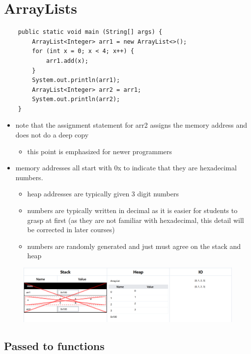 \documentclass{article}
\begin{document}
\pagebreak


\section{ArrayLists}

\begin{verbatim}
	public static void main (String[] args) {
	    ArrayList<Integer> arr1 = new ArrayList<>();
	    for (int x = 0; x < 4; x++) {
	        arr1.add(x);
	    }
	    System.out.println(arr1);
	    ArrayList<Integer> arr2 = arr1;
	    System.out.println(arr2);
	}
\end{verbatim}

\begin{itemize}
	\item note that the assignment statement for arr2 assigns the memory address
	and does not do a deep copy
	\begin{itemize}
		\item this point is emphasized for newer programmers
	\end{itemize}
	\item memory addresses all start with 0x to indicate that they are
	hexadecimal numbers.
	\begin{itemize}
		\item heap addresses are typically given 3 digit numbers
		\item numbers are typically written in decimal as it is easier for
		students to grasp at first (as they are not familiar with hexadecimal,
		this detail will be corrected in later courses)
		\item numbers are randomly generated and just must agree on the stack and heap
	\end{itemize}
\end{itemize}

\begin{figure}[H]
	\centering
	\includegraphics{arrayLists.png}
\end{figure}

\pagebreak

\subsection{Passed to functions}
\end{document}
